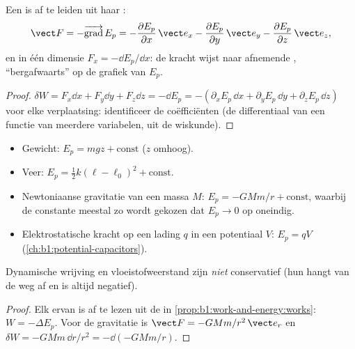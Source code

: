 \begin{proposition}\label{prop:b1:work-and-energy:gradient}
Een  is af te leiden uit haar :
\[
\vect F = -\overrightarrow{\operatorname{grad}}\,E_p
= -\frac{\partial E_p}{\partial x}\,\vect e_x
- \frac{\partial E_p}{\partial y}\,\vect e_y
- \frac{\partial E_p}{\partial z}\,\vect e_z ,
\]
en in één dimensie $F_x = -\dd E_p/\dd x$: de kracht wijst naar
afnemende , ``bergafwaarts'' op de grafiek van $E_p$.
\end{proposition}

\begin{proof}
$\delta W = F_x\dd x + F_y\dd y + F_z\dd z = -\dd E_p = -(\partial_xE_p\,\dd x
+ \partial_yE_p\,\dd y + \partial_zE_p\,\dd z)$ voor elke verplaatsing:
identificeer de coëfficiënten (de differentiaal van een functie van meerdere
variabelen, uit de wiskunde).
\end{proof}

\begin{proposition}\label{prop:b1:work-and-energy:eps}
\begin{itemize}
  \item Gewicht: $E_p = mgz + \text{const}$ ($z$ omhoog).
  \item Veer: $E_p = \tfrac12 k(\ell - \ell_0)^2 + \text{const}$.
  \item Newtoniaanse gravitatie van een massa $M$: $E_p = -GMm/r + \text{const}$,
        waarbij de constante meestal zo wordt gekozen dat $E_p \to 0$ op oneindig.
  \item Elektrostatische kracht op een lading $q$ in een potentiaal $V$:
        $E_p = qV$ (\cref{ch:b1:potential-capacitors}).
\end{itemize}
Dynamische wrijving en vloeistofweerstand zijn \emph{niet} conservatief (hun 
hangt van de weg af en is altijd negatief).
\end{proposition}

\begin{proof}
Elk ervan is af te lezen uit de  in \cref{prop:b1:work-and-energy:works}:
$W = -\Delta E_p$. Voor de gravitatie is $\vect F = -GMm/r^2\,\vect e_r$ en
$\delta W = -GMm\,\dd r/r^2 = -\dd(-GMm/r)$.
\end{proof}

